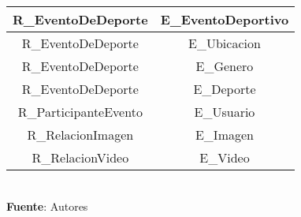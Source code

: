 \begin{table}[!htb]
\begin{center}
{\begin{tabular}{|p{4cm}|p{4cm}|p{4cm}|p{4cm}|}
			\hline
			\multicolumn{2}{|c|}{R\_EventoDeDeporte} & 
			\multicolumn{2}{c|}{E\_EventoDeportivo} \\
			\hline
			\multicolumn{2}{|c|}{R\_EventoDeDeporte} & 
			\multicolumn{2}{c|}{E\_Ubicacion} \\
			\hline
			\multicolumn{2}{|c|}{R\_EventoDeDeporte} & 
			\multicolumn{2}{c|}{E\_Genero} \\
			\hline
			\multicolumn{2}{|c|}{R\_EventoDeDeporte} & 
			\multicolumn{2}{c|}{E\_Deporte} \\
			\hline
			\multicolumn{2}{|c|}{R\_ParticipanteEvento} & 
			\multicolumn{2}{c|}{E\_Usuario} \\
			\hline
			\multicolumn{2}{|c|}{R\_RelacionImagen} & 
			\multicolumn{2}{c|}{E\_Imagen} \\
			\hline
			\multicolumn{2}{|c|}{R\_RelacionVideo} & 
			\multicolumn{2}{c|}{E\_Video} \\
			\hline
		\end{tabular}
		} \\
		\textbf{Fuente}: Autores
	\end{center}
\end{table}